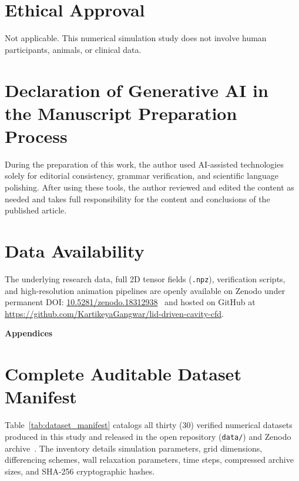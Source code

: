 \documentclass[11pt,a4paper]{article}
\begin{document}
\section*{Ethical Approval}
Not applicable. This numerical simulation study does not involve human participants, animals, or clinical data.

\section*{Declaration of Generative AI in the Manuscript Preparation Process}
During the preparation of this work, the author used AI-assisted technologies solely for editorial consistency, grammar verification, and scientific language polishing. After using these tools, the author reviewed and edited the content as needed and takes full responsibility for the content and conclusions of the published article.

\section*{Data Availability}
The underlying research data, full 2D tensor fields (\texttt{.npz}), verification scripts, and high-resolution animation pipelines are openly available on Zenodo under permanent DOI: \href{https://doi.org/10.5281/zenodo.18312938}{10.5281/zenodo.18312938}~\cite{gangwar2026solver} and hosted on GitHub at \url{https://github.com/KartikeyaGangwar/lid-driven-cavity-cfd}.




\clearpage
\appendix
\renewcommand{\thetable}{\Alph{section}.\arabic{table}}
\renewcommand{\thefigure}{\Alph{section}.\arabic{figure}}

\begin{center}
    \vspace*{1em}
    {\huge \textbf{Appendices}}
    \vspace*{1em}
\end{center}

\section{Complete Auditable Dataset Manifest}
\label{sec:appendix_manifest}
\setcounter{table}{0}

Table~\ref{tab:dataset_manifest} catalogs all thirty (30) verified numerical datasets produced in this study and released in the open repository (\texttt{data/}) and Zenodo archive~\cite{gangwar2026solver}. The inventory details simulation parameters, grid dimensions, differencing schemes, wall relaxation parameters, time steps, compressed archive sizes, and SHA-256 cryptographic hashes.
\end{document}

